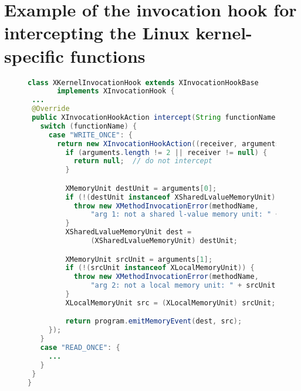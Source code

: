 \section{Example of the invocation hook for intercepting the Linux kernel-specific functions}
\label{apx:hook}

\begin{figure}[H]
%
\begin{lstlisting}[language=Java]
class XKernelInvocationHook extends XInvocationHookBase 
       implements XInvocationHook {
 ...
 @Override
 public XInvocationHookAction intercept(String functionName) {
   switch (functionName) {
     case "WRITE_ONCE": {
       return new XInvocationHookAction((receiver, arguments) -> {
         if (arguments.length != 2 || receiver != null) {
           return null;  // do not intercept
         }

         XMemoryUnit destUnit = arguments[0];
         if (!(destUnit instanceof XSharedLvalueMemoryUnit)) {
           throw new XMethodInvocationError(methodName, 
               "arg 1: not a shared l-value memory unit: " + destUnit);
         }
         XSharedLvalueMemoryUnit dest = 
               (XSharedLvalueMemoryUnit) destUnit;

         XMemoryUnit srcUnit = arguments[1];
         if (!(srcUnit instanceof XLocalMemoryUnit)) {
           throw new XMethodInvocationError(methodName, 
               "arg 2: not a local memory unit: " + srcUnit);
         }
         XLocalMemoryUnit src = (XLocalMemoryUnit) srcUnit;

         return program.emitMemoryEvent(dest, src);
     });
   }
   case "READ_ONCE": {
     ...
   }
 }
}
\end{lstlisting}
%
\end{figure}